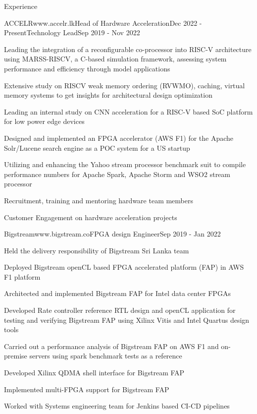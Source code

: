 \documentclass[
11pt, %
]{./assets/resume} %
\begin{document}
\begin{rSection}{Experience}
	\begin{rSubsectionM}{ACCELR}{www.accelr.lk}{Head of Hardware Acceleration}{Dec 2022 - Present}{Technology Lead}{Sep 2019 - Nov 2022}{}{}
		\item Leading the integration of a reconfigurable co-processor into RISC-V architecture using MARSS-RISCV, a C-based simulation framework, assessing system performance and efficiency through model applications
		\item Extensive study on RISCV weak memory ordering (RVWMO), caching, virtual memory systems to get insights for architectural design optimization
		\item Leading an internal study on CNN acceleration for a RISC-V based SoC platform for low power edge devices
		\item Designed and implemented an FPGA accelerator (AWS F1) for the Apache Solr/Lucene search engine as a POC system for a US startup
		\item Utilizing and enhancing the Yahoo stream processor benchmark suit to compile performance numbers for  Apache Spark, Apache Storm and WSO2 stream processor
		\item Recruitment, training and mentoring hardware team members
		\item Customer Engagement on hardware acceleration projects
	\end{rSubsectionM}
	\begin{rSubsectionX}{Bigstream}{www.bigstream.co}{FPGA design Engineer}{Sep 2019 - Jan 2022}
		\item Held the delivery responsibility of Bigstream Sri Lanka team
		\item Deployed Bigstream openCL based FPGA accelerated platform (FAP) in AWS F1 platform
		\item Architected and implemented Bigstream FAP for Intel data center FPGAs
		\item Developed Rate controller reference RTL design and openCL application for testing and verifying Bigstream FAP using Xilinx Vitis and Intel Quartus design tools
		\item Carried out a performance analysis of Bigstream FAP on AWS F1 and on-premise servers using spark benchmark tests as a reference
		\item Developed Xilinx QDMA shell interface for Bigstream FAP
		\item Implemented multi-FPGA support for Bigstream FAP
		\item Worked with Systems engineering team for Jenkins based CI-CD pipelines

\end{rSubsectionX}
\end{rSection}
\end{document}

